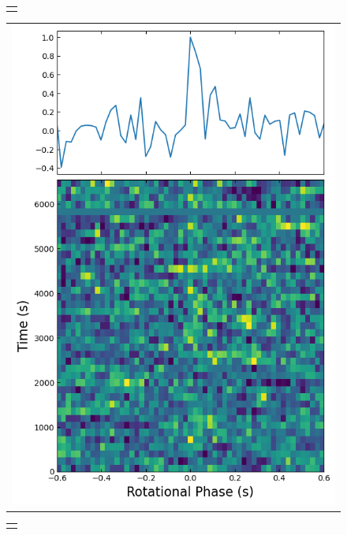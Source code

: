 \documentclass[twocolumn]{emulateapj}
\begin{document}
\begin{figure}[b]
    \begin{tabular}[b]{@{}p{}@{}}
    {}
    \end{tabular}
    \begin{tabular}[b]{@{}p{}@{}}
    \centering
	\includegraphics[width=\linewidth]{plots/x-band_Apr08.png}
    \end{tabular}
    \begin{tabular}[b]{@{}p{}@{}}
    \centering

\end{tabular}
\end{figure}
\end{document}

